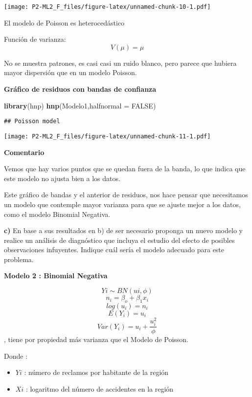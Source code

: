 \documentclass[]{article}
\newenvironment{Shaded}{\begin{snugshade}}{\end{snugshade}}
\newcommand{\DataTypeTok}[1]{\textcolor[rgb]{0.13,0.29,0.53}{#1}}
\newcommand{\KeywordTok}[1]{\textcolor[rgb]{0.13,0.29,0.53}{\textbf{#1}}}
\newcommand{\NormalTok}[1]{#1}
\newcommand{\OtherTok}[1]{\textcolor[rgb]{0.56,0.35,0.01}{#1}}
\begin{document}
\texttt{[image: P2-ML2\_F\_files/figure-latex/unnamed-chunk-10-1.pdf]}

El modelo de Poisson es heterocedástico

Función de varianza: \[V(μ)=μ\]

No se muestra patrones, es casi casi un ruido blanco, pero parece que
hubiera mayor dispersión que en un modelo Poisson.

\textbf{Gráfico de residuos con bandas de confianza}

\begin{Shaded}
\begin{Highlighting}[]
\KeywordTok{library}\NormalTok{(hnp)}
\KeywordTok{hnp}\NormalTok{(Modelo1,}\DataTypeTok{halfnormal =} \OtherTok{FALSE}\NormalTok{)}
\end{Highlighting}
\end{Shaded}

\begin{verbatim}
## Poisson model
\end{verbatim}

\texttt{[image: P2-ML2\_F\_files/figure-latex/unnamed-chunk-11-1.pdf]}

\textbf{Comentario }

Vemos que hay varios puntos que se quedan fuera de la banda, lo que
indica que este modelo no ajusta bien a los datos.

Este gráfico de bandas y el anterior de residuos, nos hace pensar que
necesitamos un modelo que contemple mayor varianza para que se ajuste
mejor a los datos, como el modelo Binomial Negativa.

\textbf{c)} En base a sus resultados en b) de ser necesario proponga un
nuevo modelo y realice un análisis de diagnóstico que incluya el estudio
del efecto de posibles observaciones infuyentes. Indique cuál sería el
modelo adecuado para este problema.

\textbf{Modelo 2 : Binomial Negativa}

\[Yi \sim BN(ui,\phi)\] \[n_i  = \beta_o + \beta_1 x_i\]
\[log(u_i)  = n_i\] \[E(Y_i)  = u_i\]
\[ Var(Y_i)  = u_i + \frac{u_i^2}{\phi}\] , tiene por propiedad más
varianza que el Modelo de Poisson.

Donde :

\begin{itemize}
\item
  \(Yi\) : número de reclamos por habitante de la región
\item
  \(Xi\) : logaritmo del número de accidentes en la región
\end{itemize}
\end{document}
